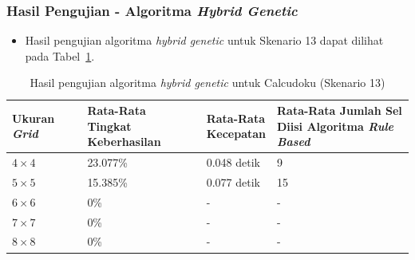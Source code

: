 \documentclass{beamer}
\begin{document}
\begin{frame}
\frametitle{Hasil Pengujian - Algoritma \textit{Hybrid Genetic}}
\begin{itemize}
\item Hasil pengujian algoritma \textit{hybrid genetic} untuk Skenario 13 dapat dilihat pada Tabel~\ref{tab:pengujianhg13}.
\end{itemize}
\begin{table}
\tiny
\centering
\captionsetup{justification=centering}
\caption[Hasil pengujian algoritma \textit{hybrid genetic} untuk Calcudoku (Skenario 13)]{Hasil pengujian algoritma \textit{hybrid genetic} untuk Calcudoku (Skenario 13)}
\begin{tabular}{| l | l | l | l |}
\hline
Ukuran \textit{Grid} & \makecell[c]{Rata-Rata \\ Tingkat Keberhasilan} & \makecell[c]{Rata-Rata \\ Kecepatan} & \makecell[c]{Rata-Rata Jumlah Sel \\ Diisi Algoritma \textit{Rule Based}} \\
\hline \hline
\begin{math}4 \times 4\end{math} & 23.077\% & 0.048 detik & 9 \\
\hline
\begin{math}5 \times 5\end{math} & 15.385\% & 0.077 detik & 15 \\
\hline
\begin{math}6 \times 6\end{math} & 0\% & - & - \\
\hline
\begin{math}7 \times 7\end{math} & 0\% & - & - \\
\hline
\begin{math}8 \times 8\end{math} & 0\% & - & - \\
\hline
\end{tabular}
\label{tab:pengujianhg13}
\end{table}
\end{frame}

\end{document}
